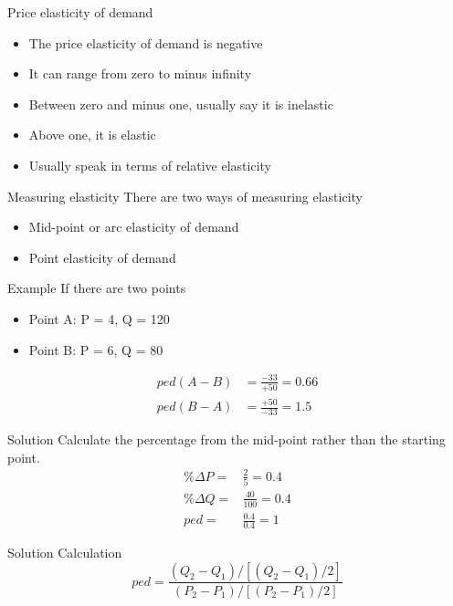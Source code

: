 \documentclass[14pt,xcolor=pdftex,dvipsnames,table]{beamer}\usepackage[]{graphicx}\usepackage[]{color}
\begin{document}
\begin{frame}{Price elasticity of demand}
\begin{itemize}[<+-| alert@+>]
\item The price elasticity of demand is negative
\item It can range from zero to minus infinity
\item Between zero and minus one, usually say it is inelastic
\item Above one, it is elastic
\item Usually speak in terms of relative elasticity
\end{itemize}
\end{frame}

\begin{frame}{Measuring elasticity}
There are two ways of measuring elasticity 
\begin{itemize}[<+-| alert@+>]
\item Mid-point or arc elasticity of demand
\item Point elasticity of demand
\end{itemize}
\end{frame}

\begin{frame}{Example}
If there are two points
\begin{itemize}[<+-| alert@+>]
\item Point A:  P = 4, Q = 120
\item Point B: P = 6, Q = 80
\end{itemize}
\pause
\begin{align*}
ped(A - B) &= \frac{-33}{+50} = 0.66\\
ped(B - A) & = \frac{+50}{-33} = 1.5
\end{align*}
\end{frame}

\begin{frame}{Solution}
Calculate the percentage from the mid-point rather than the starting point. 
\begin{align*}
\% \Delta P =& \frac{2}{5} = 0.4\\
\% \Delta Q =& \frac{40}{100} = 0.4\\
ped = &\frac{0.4}{0.4} = 1
\end{align*}
\end{frame}

\begin{frame}{Solution}
Calculation 
\begin{equation*}
ped = \frac{(Q_2 - Q_1)/[(Q_2 - Q_1)/2]}{(P_2 - P_1)/[(P_2 - P_1)/2]}
\end{equation*}
\end{frame}
\end{document}
